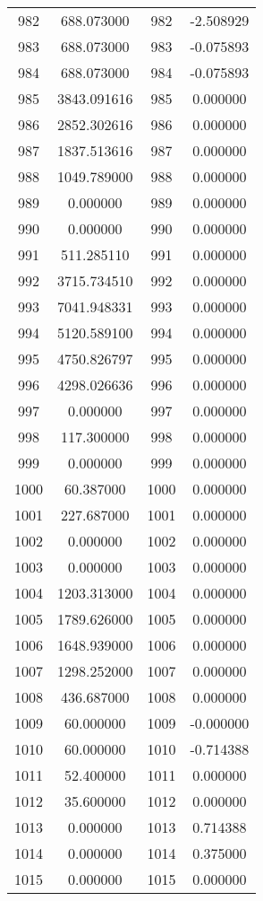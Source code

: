 \documentclass[12pt]{article}
\begin{document}
\begin{longtable}{@{}cccc@{}}
982 & 688.073000 & 982 & -2.508929 \\
983 & 688.073000 & 983 & -0.075893 \\
984 & 688.073000 & 984 & -0.075893 \\
985 & 3843.091616 & 985 & 0.000000 \\
986 & 2852.302616 & 986 & 0.000000 \\
987 & 1837.513616 & 987 & 0.000000 \\
988 & 1049.789000 & 988 & 0.000000 \\
989 & 0.000000 & 989 & 0.000000 \\
990 & 0.000000 & 990 & 0.000000 \\
991 & 511.285110 & 991 & 0.000000 \\
992 & 3715.734510 & 992 & 0.000000 \\
993 & 7041.948331 & 993 & 0.000000 \\
994 & 5120.589100 & 994 & 0.000000 \\
995 & 4750.826797 & 995 & 0.000000 \\
996 & 4298.026636 & 996 & 0.000000 \\
997 & 0.000000 & 997 & 0.000000 \\
998 & 117.300000 & 998 & 0.000000 \\
999 & 0.000000 & 999 & 0.000000 \\
1000 & 60.387000 & 1000 & 0.000000 \\
1001 & 227.687000 & 1001 & 0.000000 \\
1002 & 0.000000 & 1002 & 0.000000 \\
1003 & 0.000000 & 1003 & 0.000000 \\
1004 & 1203.313000 & 1004 & 0.000000 \\
1005 & 1789.626000 & 1005 & 0.000000 \\
1006 & 1648.939000 & 1006 & 0.000000 \\
1007 & 1298.252000 & 1007 & 0.000000 \\
1008 & 436.687000 & 1008 & 0.000000 \\
1009 & 60.000000 & 1009 & -0.000000 \\
1010 & 60.000000 & 1010 & -0.714388 \\
1011 & 52.400000 & 1011 & 0.000000 \\
1012 & 35.600000 & 1012 & 0.000000 \\
1013 & 0.000000 & 1013 & 0.714388 \\
1014 & 0.000000 & 1014 & 0.375000 \\
1015 & 0.000000 & 1015 & 0.000000 \\

\end{longtable}
\end{document}
